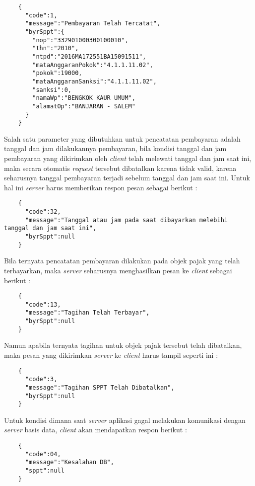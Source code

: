 \documentclass[pdftex,12pt, oneside]{article}
\begin{document}
\begin{enumerate}[1.]
  \begin{lstlisting}
    {
      "code":1,
      "message":"Pembayaran Telah Tercatat",
      "byrSppt":{
        "nop":"332901000300100010",
        "thn":"2010",
        "ntpd":"2016MA172551BA15091511",
        "mataAnggaranPokok":"4.1.1.11.02",
        "pokok":19000,
        "mataAnggaranSanksi":"4.1.1.11.02",
        "sanksi":0,
        "namaWp":"BENGKOK KAUR UMUM",
        "alamatOp":"BANJARAN - SALEM"
      }
    }
  \end{lstlisting}
  
  Salah satu parameter yang dibutuhkan untuk pencatatan pembayaran adalah tanggal dan jam dilakukannya pembayaran, bila kondisi tanggal dan jam pembayaran yang dikirimkan oleh \textit{client} telah melewati tanggal dan jam saat ini, maka secara otomatis \textit{request} tersebut dibatalkan karena tidak valid, karena seharusnya tanggal pembayaran terjadi sebelum tanggal dan jam saat ini. Untuk hal ini \textit{server} harus memberikan respon pesan sebagai berikut :
  
  \begin{lstlisting}
    {
      "code":32,
      "message":"Tanggal atau jam pada saat dibayarkan melebihi tanggal dan jam saat ini",
      "byrSppt":null
    }
  \end{lstlisting}
  
  Bila ternyata pencatatan pembayaran dilakukan pada objek pajak yang telah terbayarkan, maka \textit{server} seharusnya menghasilkan pesan ke \textit{client} sebagai berikut :
  
  \begin{lstlisting}
    {
      "code":13,
      "message":"Tagihan Telah Terbayar",
      "byrSppt":null
    }
  \end{lstlisting}
  
  Namun apabila ternyata tagihan untuk objek pajak tersebut telah dibatalkan, maka pesan yang dikirimkan \textit{server} ke \textit{client} harus tampil seperti ini :
  
  \begin{lstlisting}
    {
      "code":3,
      "message":"Tagihan SPPT Telah Dibatalkan",
      "byrSppt":null
    }
  \end{lstlisting}
  
  Untuk kondisi dimana saat \textit{server} aplikasi gagal melakukan komunikasi dengan \textit{server} basis data, \textit{client} akan mendapatkan respon berikut :
  
  \begin{lstlisting}
    {
      "code":04,
      "message":"Kesalahan DB",
      "sppt":null
    }
  \end{lstlisting}
  

\end{enumerate}
\end{document}
